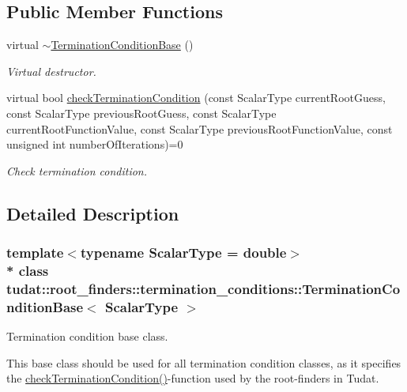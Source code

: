 \subsection*{Public Member Functions}
\begin{DoxyCompactItemize}
\item 
virtual \hyperlink{classtudat_1_1root__finders_1_1termination__conditions_1_1TerminationConditionBase_a3765f3bd652a3656026cfc684215a8a5}{$\sim$\+Termination\+Condition\+Base} ()\hypertarget{classtudat_1_1root__finders_1_1termination__conditions_1_1TerminationConditionBase_a3765f3bd652a3656026cfc684215a8a5}{}\label{classtudat_1_1root__finders_1_1termination__conditions_1_1TerminationConditionBase_a3765f3bd652a3656026cfc684215a8a5}

\begin{DoxyCompactList}\small\item\em Virtual destructor. \end{DoxyCompactList}\item 
virtual bool \hyperlink{classtudat_1_1root__finders_1_1termination__conditions_1_1TerminationConditionBase_a54a1719f2a979d8ca0bafdc835ad180d}{check\+Termination\+Condition} (const Scalar\+Type current\+Root\+Guess, const Scalar\+Type previous\+Root\+Guess, const Scalar\+Type current\+Root\+Function\+Value, const Scalar\+Type previous\+Root\+Function\+Value, const unsigned int number\+Of\+Iterations)=0
\begin{DoxyCompactList}\small\item\em Check termination condition. \end{DoxyCompactList}\end{DoxyCompactItemize}


\subsection{Detailed Description}
\subsubsection*{template$<$typename Scalar\+Type = double$>$\\*
class tudat\+::root\+\_\+finders\+::termination\+\_\+conditions\+::\+Termination\+Condition\+Base$<$ Scalar\+Type $>$}

Termination condition base class. 

This base class should be used for all termination condition classes, as it specifies the \hyperlink{classtudat_1_1root__finders_1_1termination__conditions_1_1TerminationConditionBase_a54a1719f2a979d8ca0bafdc835ad180d}{check\+Termination\+Condition()}-\/function used by the root-\/finders in Tudat. 

